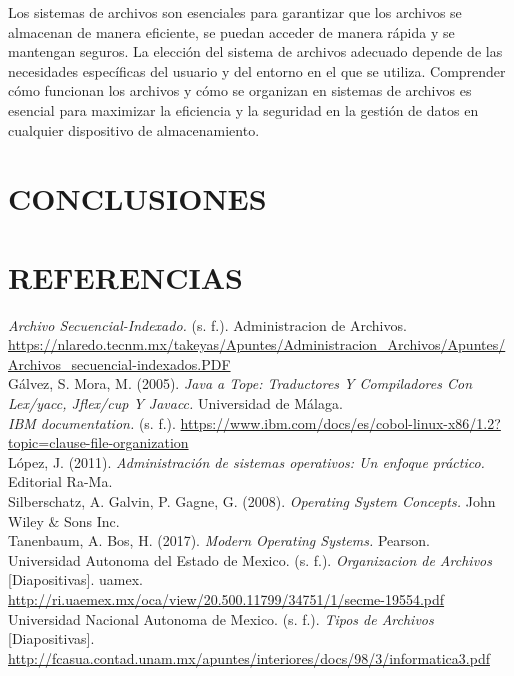 \documentclass[11pt, twocolumn]{article}
\begin{document}
  Los sistemas de archivos son esenciales para garantizar que los archivos se almacenan de manera eficiente, se puedan acceder de manera rápida y se mantengan seguros. La elección del sistema de archivos adecuado depende de las necesidades específicas del usuario y del entorno en el que se utiliza. Comprender cómo funcionan los archivos y cómo se organizan en sistemas de archivos es esencial para maximizar la eficiencia y la seguridad en la gestión de datos en cualquier dispositivo de almacenamiento.


  \section{CONCLUSIONES}
  \lipsum[12-13]

  \section{REFERENCIAS}
  \setlength{\parindent}{0.0cm}
  \small
  \textit{Archivo Secuencial-Indexado.} (s. f.). Administracion de Archivos. \url{https://nlaredo.tecnm.mx/takeyas/Apuntes/Administracion_Archivos/Apuntes/Archivos_secuencial-indexados.PDF} \\

  Gálvez, S. Mora, M. (2005). \textit{Java a Tope: Traductores Y Compiladores Con Lex/yacc, Jflex/cup Y Javacc.} Universidad de Málaga. \\

  \textit{IBM documentation.} (s. f.). \url{https://www.ibm.com/docs/es/cobol-linux-x86/1.2?topic=clause-file-organization} \\

  López, J. (2011). \textit{Administración de sistemas operativos: Un enfoque práctico.} Editorial Ra-Ma. \\

  Silberschatz, A. Galvin, P. Gagne, G. (2008). \textit{Operating System Concepts.} John Wiley $\&$ Sons Inc. \\

  Tanenbaum, A. Bos, H. (2017). \textit{Modern Operating Systems.} Pearson. \\

  Universidad Autonoma del Estado de Mexico. (s. f.). \textit{Organizacion de Archivos} [Diapositivas]. uamex. \url{http://ri.uaemex.mx/oca/view/20.500.11799/34751/1/secme-19554.pdf} \\

  Universidad Nacional Autonoma de Mexico. (s. f.). \textit{Tipos de Archivos} [Diapositivas]. \url{http://fcasua.contad.unam.mx/apuntes/interiores/docs/98/3/informatica3.pdf} \\
\end{document}
